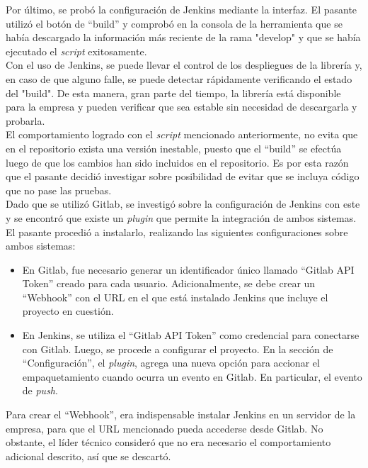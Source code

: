 Por último, se probó la configuración de Jenkins mediante la interfaz. El pasante utilizó el botón de “build” y comprobó en la consola de la herramienta que se había descargado la información más reciente de la rama "develop" y que se había ejecutado el \textit{script} exitosamente. \\

Con el uso de Jenkins, se puede llevar el control de los despliegues de la librería y, en caso de que alguno falle, se puede detectar rápidamente verificando el estado del "build". De esta manera, gran parte del tiempo, la librería está disponible para la empresa y pueden verificar que sea estable sin necesidad de descargarla y probarla. \\

El comportamiento logrado con el \textit{script} mencionado anteriormente, no evita que en el repositorio exista una versión inestable, puesto que el “build” se efectúa luego de que los cambios han sido incluidos en el repositorio. Es por esta razón que el pasante decidió investigar sobre posibilidad de evitar que se incluya código que no pase las pruebas. \\

Dado que se utilizó Gitlab, se investigó sobre la configuración de Jenkins con este y se encontró que existe un \textit{plugin} que permite la integración de ambos sistemas. El pasante procedió a instalarlo, realizando las siguientes configuraciones sobre ambos sistemas:

\begin{itemize}
    \item En Gitlab, fue necesario generar un identificador único llamado “Gitlab API Token” creado para cada usuario. Adicionalmente, se debe crear un “Webhook” con el URL en el que está instalado Jenkins que incluye el proyecto en cuestión.
    \item En Jenkins, se utiliza el “Gitlab API Token” como credencial para conectarse con Gitlab. Luego, se procede a configurar el proyecto. En la sección de “Configuración”, el \textit{plugin}, agrega una nueva opción para accionar el empaquetamiento cuando ocurra un evento en Gitlab. En particular, el evento de \textit{push}.
\end{itemize}


Para crear el “Webhook”, era indispensable instalar Jenkins en un servidor de la empresa, para que el URL mencionado pueda accederse desde Gitlab. No obstante, el líder técnico consideró que no era necesario el comportamiento adicional descrito, así que se descartó.\\

